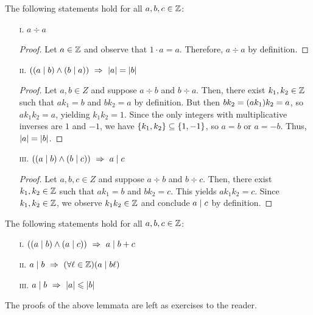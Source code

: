 \begin{lemma}\label{lem:divpartial}
    The following statements hold for all $a, b, c \in \mathbb{Z}$:
    \begin{enumerate}
        \item[\textsc{i}.]
            $a \div a$
            \begin{proof}
                Let $a \in \mathbb{Z}$ and observe that $1 \cdot a = a$.
                Therefore, $a \div a$ by definition.
            \end{proof}
        \item[\textsc{ii}.]
            $\pn*{\pn*{a \div b} \meet \pn*{b \div a}} \implies \abs{a} = \abs{b}$
            \begin{proof}
                Let $a, b \in Z$ and suppose $a \div b$ and $b \div a$.
                Then, there exist $k_1, k_2 \in \mathbb{Z}$ such that $ak_1 = b$ and $bk_2 = a$ by definition.
                But then $bk_2 = \pn*{ak_1}k_2 = a$, so $ak_1k_2 = a$, yielding $k_1k_2 = 1$.
                Since the only integers with multiplicative inverses are $1$ and $-1$,
                we have $\set*{k_1, k_2} \subseteq \set*{1, -1}$,
                so $a = b$ or $a = -b$.
                Thus, $\lvert a\rvert = \lvert b\rvert$.
            \end{proof}
        \item[\textsc{iii}.]
            $\pn*{\pn*{a \div b} \meet \pn*{b \div c}} \implies a \div c$
            \begin{proof}
                Let $a, b, c \in Z$ and suppose $a \div b$ and $b \div c$.
                Then, there exist $k_1, k_2 \in \mathbb{Z}$ such that $ak_1 = b$ and $bk_2 = c$.
                This yields $ak_1k_2 = c$.
                Since $k_1, k_2 \in \mathbb{Z}$,
                we observe $k_1k_2 \in \mathbb{Z}$ and conclude $a \mid c$ by definition.
            \end{proof}
    \end{enumerate}
    \vspace{-2ex}
\end{lemma}

\begin{lemma}\label{lem:divalgebra}
    The following statements hold for all $a, b, c \in \mathbb{Z}$:
    \begin{enumerate}
        \item[\textsc{i}.]
            $\pn*{\pn*{a \div b} \meet \pn*{a \div c}} \implies a \div b + c$
        \item[\textsc{ii}.]
            $a \div b \implies \pn*{\forall \ell \in \Z}\pn*{a \div b\ell}$
        \item[\textsc{iii}.]
            $a \mid b ~\Rightarrow~ \lvert a\rvert \leqslant \lvert b\rvert$
    \end{enumerate}
    The proofs of the above lemmata are left as exercises to the reader.
\end{lemma}

